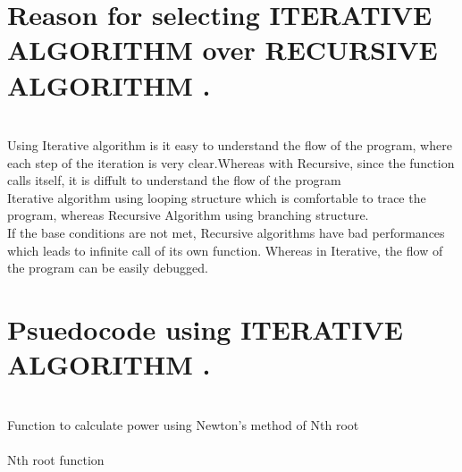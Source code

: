 \documentclass[10pt]{article}
\begin{document}
\section*{\normalsize \textbf{Reason for selecting ITERATIVE ALGORITHM over RECURSIVE ALGORITHM .}}\\

\quad \quad  * Using Iterative algorithm is it easy to understand the flow of the program, where each step of the iteration is very clear.Whereas with Recursive, since the function calls itself, it is diffult to understand the flow of the program\\

\quad* Iterative algorithm using looping structure which is comfortable to trace the program, whereas Recursive Algorithm using branching structure.\\

\quad* If the base conditions are not met, Recursive algorithms have bad performances which leads to infinite call of its own function. Whereas in Iterative, the flow of the program can be easily debugged.
\pagebreak

\section*{\normalsize \textbf{Psuedocode using ITERATIVE ALGORITHM .}}\\
Function to calculate power using {\normalsize Newton's method of Nth root}\\
\\
 Nth root function
\end{document}
